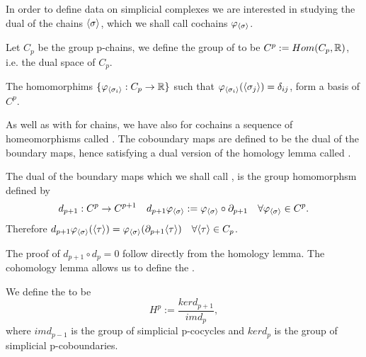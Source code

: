 \documentclass[../1.tex]{subfiles}
\begin{document}
    In order to define data on simplicial complexes we are interested in studying the dual of the chains $\langle \sigma \rangle$,
    which we shall call cochains $\varphi_{\langle \sigma \rangle}$.
       
    \begin{defn}
        Let $C_p$ be the group p-chains, we define the group of  to 
        be $C^p := Hom(C_p, \mathbb{R})$, i.e. the dual space of $C_p$.
    \end{defn}

    \begin{prop}
        The homomorphims $\{\varphi_{\langle \sigma_i \rangle}:C_p \to \mathbb{R}\}$ such that $\varphi_{\langle \sigma_i \rangle}(\langle \sigma_j \rangle) = \delta_{ij}$,
        form a basis of $C^p$.
    \end{prop}

    As well as with for chains, we have also for cochains a sequence of homeomorphisms called . The coboundary maps are defined
    to be the dual of the boundary maps, hence satisfying a dual version of the homology lemma called .

    \begin{defn}
        The dual of the boundary maps which we shall call
        , is the group homomorphsm defined by
        \[ d_{p+1} : C^p \to C^{p+1} \quad d_{p+1}\varphi_{\langle \sigma \rangle} := \varphi_{\langle \sigma \rangle} \circ \partial_{p+1} \quad \forall \varphi_{\langle \sigma \rangle} \in C^p.\]
        Therefore $d_{p+1}\varphi_{\langle \sigma \rangle}(\langle \tau \rangle) = \varphi_{\langle \sigma \rangle} (\partial_{p+1}\langle \tau \rangle) \quad \forall \langle \tau \rangle \in C_p$.
    \end{defn}

    The proof of $d_{p+1} \circ d_p = 0$ follow directly from the homology lemma. The cohomology lemma allows us to define the .
    
    \begin{defn}
        We define the  to be 
        \[H^p := \frac{ker d_{p+1}}{im d_{p}},\] 
        where $im d_{p-1}$ is the group of simplicial p-cocycles and
        $ker d_p$ is the group of simplicial p-coboundaries.
    \end{defn}

\end{document}
